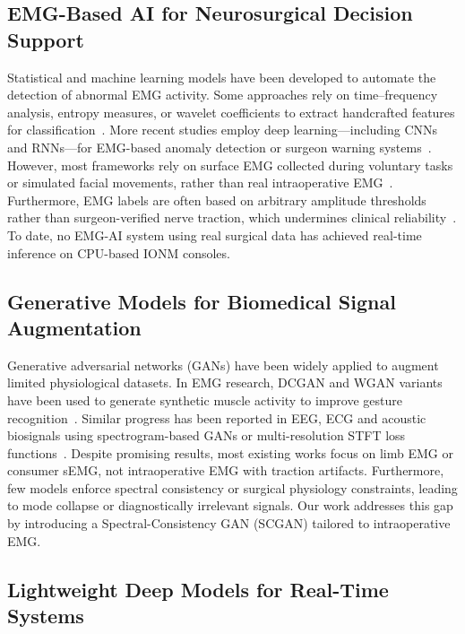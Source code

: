 \documentclass[10pt]{article}
\begin{document}
\subsection{EMG-Based AI for Neurosurgical Decision Support}

Statistical and machine learning models have been developed to automate the detection of abnormal EMG activity. Some approaches rely on time–frequency analysis, entropy measures, or wavelet coefficients to extract handcrafted features for classification~\cite{RealTime_CNN_EMG_2019}. More recent studies employ deep learning—including CNNs and RNNs—for EMG-based anomaly detection or surgeon warning systems~\cite{DeepLearning_SurfEMG_Review_2021}. However, most frameworks rely on surface EMG collected during voluntary tasks or simulated facial movements, rather than real intraoperative EMG~\cite{tsuji2024,Park2024_EMG_Scarcity}. Furthermore, EMG labels are often based on arbitrary amplitude thresholds rather than surgeon-verified nerve traction, which undermines clinical reliability~\cite{guntinas2018}. To date, no EMG-AI system using real surgical data has achieved real-time inference on CPU-based IONM consoles.

\subsection{Generative Models for Biomedical Signal Augmentation}

Generative adversarial networks (GANs) have been widely applied to augment limited physiological datasets. In EMG research, DCGAN and WGAN variants have been used to generate synthetic muscle activity to improve gesture recognition~\cite{SCGAN_EMG_Frontiers2022}. Similar progress has been reported in EEG, ECG and acoustic biosignals using spectrogram-based GANs or multi-resolution STFT loss functions~\cite{EEG_WGAN_Augment_2024,Spectrogram_GAN_Audio_2020}. Despite promising results, most existing works focus on limb EMG or consumer sEMG, not intraoperative EMG with traction artifacts. Furthermore, few models enforce spectral consistency or surgical physiology constraints, leading to mode collapse or diagnostically irrelevant signals. Our work addresses this gap by introducing a Spectral-Consistency GAN (SCGAN) tailored to intraoperative EMG.

\subsection{Lightweight Deep Models for Real-Time Systems}
\end{document}
